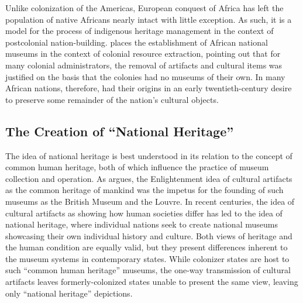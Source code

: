 \documentclass[american]{../../../coursework}
\begin{document}
Unlike colonization of the Americas, European conquest of Africa has left the
population of native Africans nearly intact with little exception. As such, it
is a model for the process of indigenous heritage management in the context of
postcolonial nation-building. \textcite{Shy09} places the establishment of
African national museums in the context of colonial resource extraction,
pointing out that for many colonial administrators, the removal of artifacts
and cultural items was justified on the basis that the colonies had no museums
of their own. In many African nations, therefore, had their origins in an
early twentieth-century desire to preserve some remainder of the nation's
cultural objects.

\subsection{The Creation of ``National Heritage''}

The idea of national heritage is best understood in its relation to the
concept of common human heritage, both of which influence the practice of
museum collection and operation. As \textcite{Tur09} argues, the Enlightenment
idea of cultural artifacts as the common heritage of mankind was the impetus
for the founding of such museums as the British Museum  and the Louvre. In
recent centuries, the idea of cultural artifacts as showing how human
societies differ has led to the idea of national heritage, where individual
nations seek to create national museums showcasing their own individual
history and culture. Both views of heritage and the human condition are
equally valid, but they present differences inherent to the museum systems in
contemporary states. While colonizer states are host to such ``common human
heritage'' museums, the one-way transmission of cultural artifacts
\parencite{Kup14} leaves formerly-colonized states unable to present the same
view, leaving only ``national heritage'' depictions.
\end{document}
